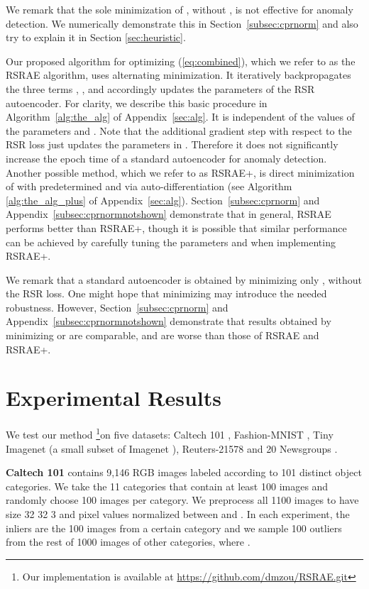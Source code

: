 \documentclass{article} \usepackage{iclr2020_conference,times}
\def\Secref#1{Section~\ref{#1}}
\def\eqref#1{(\ref{#1})}
\begin{document}
We remark that the sole minimization of , without , is not effective for anomaly detection. We  numerically demonstrate this in \Secref{subsec:cprnorm} and also try to 
explain it in Section \ref{sec:heuristic}.


Our proposed algorithm for optimizing 
\eqref{eq:combined}, which we refer to as the RSRAE algorithm, uses alternating minimization. It iteratively backpropagates the three terms , ,  and accordingly updates the parameters of the RSR autoencoder. 
For clarity, we describe this basic procedure in Algorithm~\ref{alg:the_alg} of Appendix~\ref{sec:alg}.
It is independent of the values of the parameters  and .
Note that the additional gradient step with respect to the RSR loss just updates the parameters in . Therefore it does not significantly increase the epoch time of a standard autoencoder for anomaly detection. Another possible method, which we refer to as RSRAE+, is direct minimization of  with predetermined  and  via auto-differentiation (see Algorithm \ref{alg:the_alg_plus} of Appendix~\ref{sec:alg}). \Secref{subsec:cprnorm} and Appendix~\ref{subsec:cprnormnotshown} demonstrate that in general, RSRAE performs better than RSRAE+, though it is possible that similar performance can be achieved by carefully tuning the parameters  and  when implementing RSRAE+. 

We remark that a standard autoencoder is obtained by minimizing only , without the RSR loss. One might hope that minimizing  may introduce the needed robustness. However, \Secref{subsec:cprnorm} and Appendix~\ref{subsec:cprnormnotshown} demonstrate that results obtained by minimizing  or  are comparable, and are worse than those of RSRAE and RSRAE+.





\section{{Experimental Results}}
\label{sec:real}



We test our method \footnote{{Our implementation is available at \url{https://github.com/dmzou/RSRAE.git}}}on five datasets: Caltech 101 \citep{fei2007learning}, Fashion-MNIST \citep{xiao2017fashion}, Tiny Imagenet (a small subset of Imagenet \citep{russakovsky2015imagenet}), Reuters-21578 \citep{lewis1997reuters} and 20 Newsgroups \citep{Lang95}. 



\textbf{Caltech 101} contains 9,146 RGB images labeled according to 101 distinct object categories. We take the 11 categories that contain at least 100 images and randomly choose 100 images per category. We preprocess all 1100 images to have  size 32  32  3 and pixel values normalized between  and . In each experiment, the inliers are the 100 images from a certain category and we sample   100 outliers from the rest of 1000 images of other categories, where .
\end{document}
